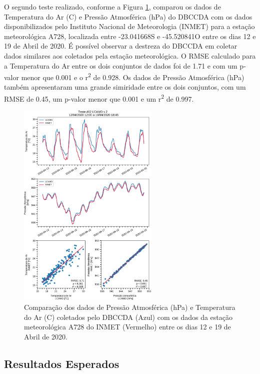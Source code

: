 \documentclass{article}
\begin{document}
O segundo teste realizado, conforme a \textcolor{bleu_cite}{Figura \ref{dadosard2}}, comparou os dados de Temperatura do Ar (\textdegree{}C) e Pressão Atmosférica (hPa) do DBCCDA com os dados disponibilizados pelo
Instituto Nacional de Meteorologia (INMET) para a estação meteorológica A728, localizada entre -23.041668\textdegree{}S e -45.520841\textdegree{}O entre os 
dias 12 e 19 de Abril de 2020. É possível observar a destreza do DBCCDA em coletar dados similares aos coletados pela estação meteorológica. O RMSE calculado 
para a Temperatura do Ar entre os dois conjuntos de dados foi de 1.71 e com um p-valor menor que 0.001 e o r\textsuperscript{2} de 0.928. Os dados de Pressão Atmosférica (hPa)
também apresentaram uma grande simiridade entre os dois conjuntos, com um RMSE de 0.45, um p-valor menor que 0.001 e um r\textsuperscript{2} de 0.997.
\bigskip

\begin{figure}[H]
    \centering
    \includegraphics[width=0.60\textwidth]{img/xy_lcamd.png}
	\caption{Comparação dos dados de Pressão Atmosférica (hPa) e Temperatura do Ar (\textdegree{}C) coletados pelo DBCCDA (Azul) com os dados da estação meteorológica A728 do INMET (Vermelho)
	entre os dias 12 e 19 de Abril de 2020.}
	\label{dadosard2}
\end{figure}

\subsection{Resultados Esperados}
\bigskip
\end{document}
